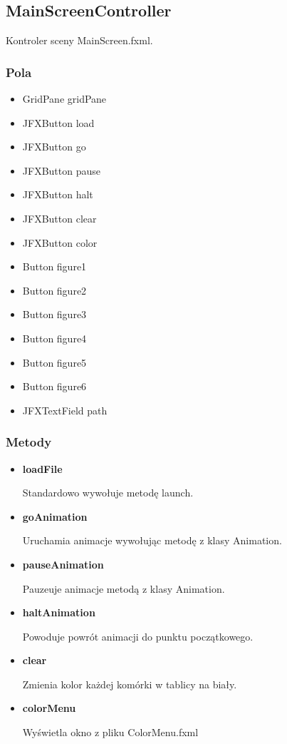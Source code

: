 \documentclass[a4paper,11pt]{article}
\begin{document}
\subsection{MainScreenController}
Kontroler sceny MainScreen.fxml.
\subsubsection{Pola}
\begin{itemize}
\item GridPane gridPane
\item JFXButton load
\item JFXButton go
\item JFXButton pause
\item JFXButton halt
\item JFXButton clear
\item JFXButton color
\item Button figure1
\item Button figure2
\item Button figure3
\item Button figure4
\item Button figure5
\item Button figure6
\item JFXTextField path
\end{itemize}
\subsubsection{Metody}
\begin{itemize}
\item \textbf{loadFile}

Standardowo wywołuje metodę launch.
\item \textbf{goAnimation}

Uruchamia animacje wywołując metodę z klasy Animation.
\item \textbf{pauseAnimation}

Pauzeuje animacje metodą z klasy Animation.
\item \textbf{haltAnimation}

Powoduje powrót animacji do punktu początkowego.
\item \textbf{clear}

Zmienia kolor każdej komórki w tablicy na biały.
\item \textbf{colorMenu}

Wyświetla okno z pliku ColorMenu.fxml
\end{itemize}
\end{document}
